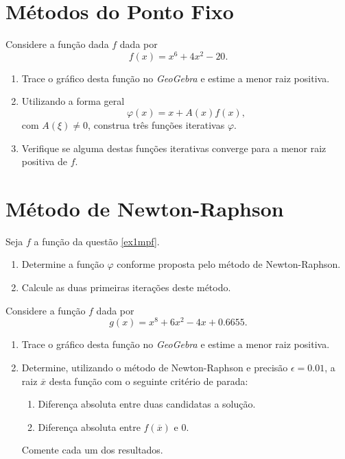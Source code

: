 \section{Métodos do Ponto Fixo}
\begin{ex}\label{ex1mpf}
Considere a função dada $f$ dada por $$f(x)=x^6+4x^2-20.$$
\begin{enumerate}
\item Trace o gráfico desta função no \emph{GeoGebra}  e estime a menor raiz positiva. 
\item Utilizando a forma geral $$\varphi(x)=x+A(x)f(x),$$ com $A(\xi)\neq 0$, construa três funções iterativas $\varphi$.
\item Verifique se alguma destas funções iterativas converge para a menor raiz positiva de $f$.
\end{enumerate}
\end{ex}
\section{Método de Newton-Raphson}
\begin{ex} Seja $f$ a função da questão \ref{ex1mpf}.
\begin{enumerate}
\item Determine a função $\varphi$ conforme proposta pelo método de Newton-Raphson.
\item Calcule as duas primeiras iterações deste método.
\end{enumerate}
\end{ex}

\begin{ex}\label{newton}
Considere a função $f$ dada por
$$ g(x) = x^8 + 6x^2 - 4x + 0.6655.$$ 
\begin{enumerate}
\item Trace o gráfico desta função no \emph{GeoGebra}  e estime a menor raiz positiva.
\item Determine, utilizando o método de Newton-Raphson e precisão $\epsilon=0.01$, a raiz $\overline{x}$ desta função com o seguinte critério de parada:
\begin{enumerate}
\item Diferença absoluta entre duas candidatas a solução.
\item Diferença absoluta entre $f(\overline{x})$ e $0$.
\end{enumerate}
Comente cada um dos resultados.
\end{enumerate}
\end{ex}

